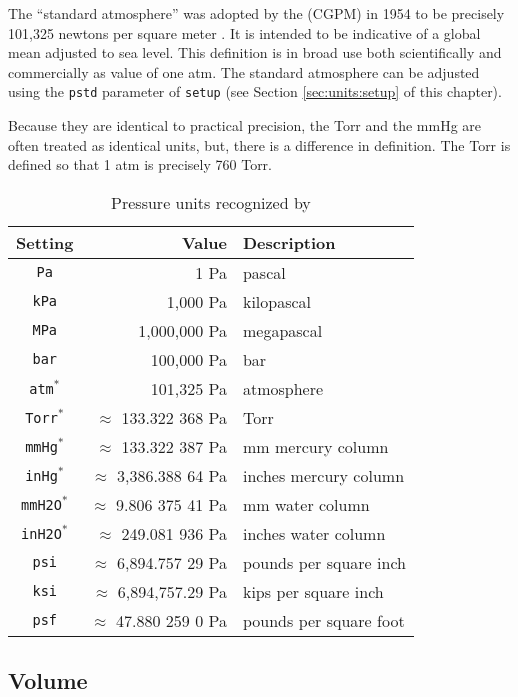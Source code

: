 The ``standard atmosphere'' was adopted by the (CGPM) in 1954 to be precisely 101,325 newtons per square meter \cite{cgpm:10:4}.  It is intended to be indicative of a global mean adjusted to sea level.  This definition is in broad use both scientifically \cite{crc} and commercially \cite{nist:sp811} as value of one atm.  The standard atmosphere can be adjusted using the \verb|pstd| parameter of \verb|setup| (see Section \ref{sec:units:setup} of this chapter).

Because they are identical to practical precision, the Torr and the mmHg are often treated as identical units, but, there is a difference in definition.  The Torr is defined so that 1 atm is precisely 760 Torr.

\begin{table}
\centering
\caption{Pressure units recognized by \PM}\label{tab:pressure}
\begin{tabular}{crl}
\hline
Setting & Value & Description\\
\hline
\verb|Pa| & 1 Pa & pascal\\
\verb|kPa| & 1,000 Pa & kilopascal\\
\verb|MPa| & 1,000,000 Pa & megapascal\\
\verb|bar| & 100,000 Pa & bar\\
\verb|atm|$^*$ & 101,325 Pa & atmosphere\\
\verb|Torr|$^*$ & $\approx$ 133.322 368 Pa & Torr\\
\verb|mmHg|$^*$ & $\approx$ 133.322 387 Pa & mm mercury column\\
\verb|inHg|$^*$ & $\approx$ 3,386.388 64 Pa & inches mercury column\\
\verb|mmH2O|$^*$ & $\approx$ 9.806 375 41 Pa & mm water column\\
\verb|inH2O|$^*$ & $\approx$ 249.081 936 Pa & inches water column\\
\verb|psi| & $\approx$ 6,894.757 29 Pa & pounds per square inch\\
\verb|ksi| & $\approx$ 6,894,757.29 Pa & kips per square inch\\
\verb|psf| & $\approx$ 47.880 259 0 Pa & pounds per square foot\\
\hline
\end{tabular}
\end{table}

%
%

\subsection{Volume}\label{sec:units:volume}

